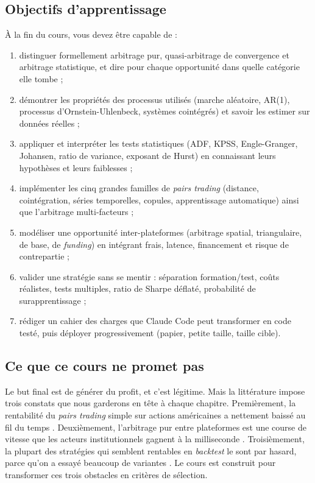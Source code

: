 \subsection{Objectifs d'apprentissage}

À la fin du cours, vous devez être capable de :
\begin{enumerate}[label=\textbf{O\arabic*.}]
\item distinguer formellement arbitrage pur, quasi-arbitrage de convergence et arbitrage statistique, et dire pour chaque opportunité dans quelle catégorie elle tombe ;
\item démontrer les propriétés des processus utilisés (marche aléatoire, AR(1), processus d'Ornstein-Uhlenbeck, systèmes cointégrés) et savoir les estimer sur données réelles ;
\item appliquer et interpréter les tests statistiques (ADF, KPSS, Engle-Granger, Johansen, ratio de variance, exposant de Hurst) en connaissant leurs hypothèses et leurs faiblesses ;
\item implémenter les cinq grandes familles de \emph{pairs trading} (distance, cointégration, séries temporelles, copules, apprentissage automatique) ainsi que l'arbitrage multi-facteurs ;
\item modéliser une opportunité inter-plateformes (arbitrage spatial, triangulaire, de base, de \emph{funding}) en intégrant frais, latence, financement et risque de contrepartie ;
\item valider une stratégie sans se mentir : séparation formation/test, coûts réalistes, tests multiples, ratio de Sharpe déflaté, probabilité de surapprentissage ;
\item rédiger un cahier des charges que Claude Code peut transformer en code testé, puis déployer progressivement (papier, petite taille, taille cible).
\end{enumerate}

\subsection{Ce que ce cours ne promet pas}

Le but final est de générer du profit, et c'est légitime. Mais la littérature impose trois constats que nous garderons en tête à chaque chapitre. Premièrement, la rentabilité du \emph{pairs trading} simple sur actions américaines a nettement baissé au fil du temps \citep{dofaff2010,dofaff2012}. Deuxièmement, l'arbitrage pur entre plateformes est une course de vitesse que les acteurs institutionnels gagnent à la milliseconde \citep{budish2015}. Troisièmement, la plupart des stratégies qui semblent rentables en \emph{backtest} le sont par hasard, parce qu'on a essayé beaucoup de variantes \citep{bailey2014dsr,harvey2016}. Le cours est construit pour transformer ces trois obstacles en critères de sélection.

